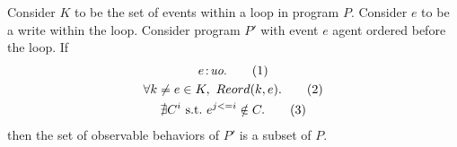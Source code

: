 \begin{corollary}
    \label{LoopInvCodeMotWrite1}
    Consider $K$ to be the set of events within a loop in program $P$. 
    Consider $e$ to be a write within the loop. 
    Consider program $P'$ with event $e$ agent ordered before the loop. 
    If
    \begin{gather}
        e\!:\!\textit{uo}. \tag{1} \label{licmw1:eq1}\\
        \forall k \neq e \in K, \ Reord(k, e). \tag{2} \label{licmw1:eq2} \\ 
        \nexists C^i \ \text{s.t.} \ e^{j<=i} \notin C. \tag{3} \label{licmw1:eq3}                    
    \end{gather}
    then the set of observable behaviors of $P'$ is a subset of $P$.

\end{corollary}             

